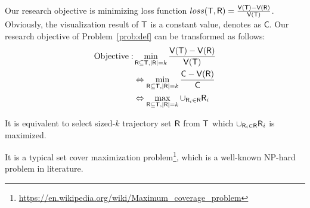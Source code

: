 Our research objective is minimizing loss function $loss(\mathsf{T}, \mathsf{R}) =  \frac{\mathsf{V}(\mathsf{T}) - \mathsf{V}(\mathsf{R})}{\mathsf{V}(\mathsf{T})}$.
Obviously, the visualization result of $\mathsf{T}$ is a constant value, denotes as $\mathsf{C}$.
Our research objective of Problem~\ref{prob:def} can be transformed as follows:
\begin{align}\label{eqn:obj2} \nonumber
\text{Objective}: & \min_{\mathsf{R} \subseteq \mathsf{T}, |\mathsf{R}| = k}  \frac{\mathsf{V}(\mathsf{T}) - \mathsf{V}(\mathsf{R})}{\mathsf{V}(\mathsf{T})} \\ \nonumber
& \Leftrightarrow \min_{\mathsf{R} \subseteq \mathsf{T}, |\mathsf{R}| = k}  \frac{\mathsf{C} - \mathsf{V}(\mathsf{R})}{\mathsf{C}} \\ \nonumber
& \Leftrightarrow \max_{\mathsf{R} \subseteq \mathsf{T}, |\mathsf{R}| = k}  \cup_{\mathsf{R}_i \in \mathsf{R}} \mathsf{R}_i
\end{align}

It is equivalent to select sized-$k$ trajectory set $\mathsf{R}$ from $\mathsf{T}$ which $\cup_{\mathsf{R}_i \in \mathsf{R}} \mathsf{R}_i$ is maximized.

It is a typical set cover maximization problem\footnote{\url{https://en.wikipedia.org/wiki/Maximum_coverage_problem}}, which is a well-known NP-hard problem in literature.




